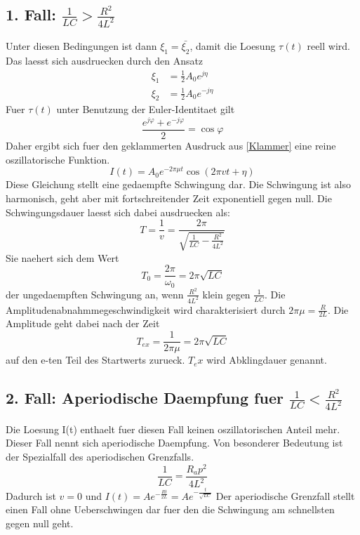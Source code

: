 \documentclass[titlepage=firstcover, captions=tableheading]{scrartcl}
\begin{document}
\subsection{1. Fall: $\frac{1}{LC}>\frac{R^2}{4L^2}$}
Unter diesen Bedingungen ist dann $\xi_1 =\bar{\xi_2}$, damit die Loesung $\tau(t)$ reell wird.
Das laesst sich ausdruecken durch den Ansatz
\begin{align}
    \xi_1&=\frac{1}{2}A_0e^{j\eta}\nonumber\\
    \xi_2&=\frac{1}{2}A_0e^{-j\eta}\nonumber
\end{align}
Fuer $\tau(t)$ unter Benutzung der Euler-Identitaet gilt
\begin{equation}
    \frac{e^{j\varphi}+e^{-j\varphi}}{2}=\cos\varphi \nonumber
\end{equation}
Daher ergibt sich fuer den geklammerten Ausdruck aus \ref{Klammer} eine reine oszillatorische Funktion.
\begin{equation}\label{Reff2}
    I(t)=A_0e^{-2\pi\mu t}\cos(2\pi vt+\eta)\nonumber
\end{equation}
Diese Gleichung stellt eine gedaempfte Schwingung dar. Die Schwingung ist also harmonisch, geht aber mit fortschreitender Zeit exponentiell gegen null. Die Schwingungsdauer laesst sich dabei ausdruecken als:
\begin{equation}
    T=\frac{1}{v}=\frac{2\pi}{\sqrt{\frac{1}{LC}-\frac{R^2}{4L^2}}}\nonumber
\end{equation}
Sie naehert sich dem Wert
\begin{equation}
    T_0=\frac{2\pi}{\omega_0}=2\pi\sqrt{LC}\nonumber
\end{equation}
der ungedaempften Schwingung an, wenn $\frac{R^2}{4L^2}$ klein gegen $\frac{1}{LC}$.
Die Amplitudenabnahmmegeschwindigkeit wird charakterisiert durch $2\pi\mu=\frac{R}{2L}$.
Die Amplitude geht dabei nach der Zeit 
\begin{equation}\label{Tex}
    T_{ex}=\frac{1}{2\pi\mu}=2\pi\sqrt{LC}
\end{equation}
auf den e-ten Teil des Startwerts zurueck. $T_ex$ wird Abklingdauer genannt.
\subsection{2. Fall: Aperiodische Daempfung fuer $\frac{1}{LC}<\frac{R^2}{4L^2}$}
Die Loesung I(t) enthaelt fuer diesen Fall keinen oszillatorischen Anteil mehr. Dieser Fall nennt sich aperiodische Daempfung. Von besonderer Bedeutung ist der Spezialfall des aperiodischen Grenzfalls.
\begin{equation}\label{Rap}
    \frac{1}{LC}=\frac{R_ap^2}{4L^2}
\end{equation}
Dadurch ist $v=0$ und $I(t)=Ae^{-\frac{Rt}{2L}}=Ae^{-\frac{t}{\sqrt{LC}}}$
Der aperiodische Grenzfall stellt einen Fall ohne Ueberschwingen dar fuer den die Schwingung am schnellsten gegen null geht.
\end{document}

